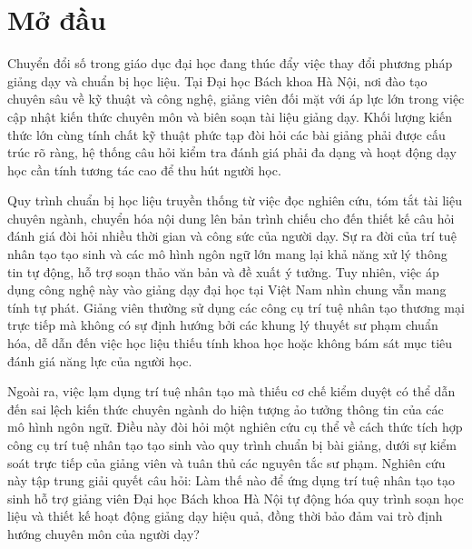 \section{Mở đầu}

Chuyển đổi số trong giáo dục đại học đang thúc đẩy việc thay đổi phương pháp giảng dạy và chuẩn bị học liệu. Tại Đại học Bách khoa Hà Nội, nơi đào tạo chuyên sâu về kỹ thuật và công nghệ, giảng viên đối mặt với áp lực lớn trong việc cập nhật kiến thức chuyên môn và biên soạn tài liệu giảng dạy. Khối lượng kiến thức lớn cùng tính chất kỹ thuật phức tạp đòi hỏi các bài giảng phải được cấu trúc rõ ràng, hệ thống câu hỏi kiểm tra đánh giá phải đa dạng và hoạt động dạy học cần tính tương tác cao để thu hút người học.

Quy trình chuẩn bị học liệu truyền thống từ việc đọc nghiên cứu, tóm tắt tài liệu chuyên ngành, chuyển hóa nội dung lên bản trình chiếu cho đến thiết kế câu hỏi đánh giá đòi hỏi nhiều thời gian và công sức của người dạy. Sự ra đời của trí tuệ nhân tạo tạo sinh và các mô hình ngôn ngữ lớn mang lại khả năng xử lý thông tin tự động, hỗ trợ soạn thảo văn bản và đề xuất ý tưởng. Tuy nhiên, việc áp dụng công nghệ này vào giảng dạy đại học tại Việt Nam nhìn chung vẫn mang tính tự phát. Giảng viên thường sử dụng các công cụ trí tuệ nhân tạo thương mại trực tiếp mà không có sự định hướng bởi các khung lý thuyết sư phạm chuẩn hóa, dễ dẫn đến việc học liệu thiếu tính khoa học hoặc không bám sát mục tiêu đánh giá năng lực của người học.

Ngoài ra, việc lạm dụng trí tuệ nhân tạo mà thiếu cơ chế kiểm duyệt có thể dẫn đến sai lệch kiến thức chuyên ngành do hiện tượng ảo tưởng thông tin của các mô hình ngôn ngữ. Điều này đòi hỏi một nghiên cứu cụ thể về cách thức tích hợp công cụ trí tuệ nhân tạo tạo sinh vào quy trình chuẩn bị bài giảng, dưới sự kiểm soát trực tiếp của giảng viên và tuân thủ các nguyên tắc sư phạm. Nghiên cứu này tập trung giải quyết câu hỏi: Làm thế nào để ứng dụng trí tuệ nhân tạo tạo sinh hỗ trợ giảng viên Đại học Bách khoa Hà Nội tự động hóa quy trình soạn học liệu và thiết kế hoạt động giảng dạy hiệu quả, đồng thời bảo đảm vai trò định hướng chuyên môn của người dạy?
